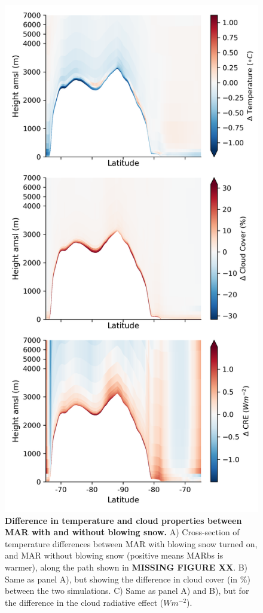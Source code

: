 \documentclass[12pt]{article}
\begin{document}
\begin{figure}[H]
	\includegraphics[scale=0.7,center]{cross_section_lt.png}
	\caption{\textbf{Difference in temperature and cloud properties between MAR with and without blowing snow.} A) Cross-section of temperature differences between MAR with blowing snow turned on, and MAR without blowing snow (positive means MARbs is warmer), along the path shown in \textbf{MISSING FIGURE XX}. B) Same as panel A), but showing the difference in cloud cover (in \%) between the two simulations. C) Same as panel A) and B), but for the difference in the cloud radiative effect ($Wm^{-2}$). }
	\label{fig:Test}
\end{figure}
\end{document}
